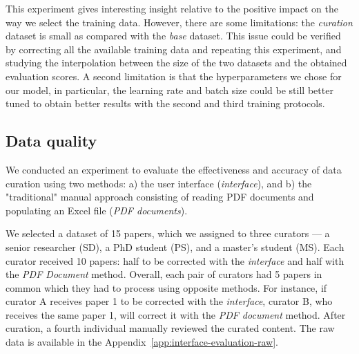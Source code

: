 \documentclass[]{interact}
\theoremstyle{plain} %
\theoremstyle{definition}
\theoremstyle{remark}
\begin{document}

This experiment gives interesting insight relative to the positive impact on the way we select the training data. 
However, there are some limitations: the \emph{curation} dataset is small as compared with the \emph{base} dataset. This issue could be verified by correcting all the available training data and repeating this experiment, and studying the interpolation between the size of the two datasets and the obtained evaluation scores. 
A second limitation is that the hyperparameters we chose for our model, in particular, the learning rate and batch size could be still better tuned to obtain better results with the second and third training protocols.


\subsection{Data quality}
\label{sec:interface-evaluation}
We conducted an experiment to evaluate the effectiveness and accuracy of data curation using two methods: a) the user interface (\textit{interface}), and b) the "traditional" manual approach consisting of reading PDF documents and populating an Excel file (\textit{PDF documents}).

We selected a dataset of 15 papers, which we assigned to three curators — a senior researcher (SD), a PhD student (PS), and a master's student (MS). 
Each curator received 10 papers: half to be corrected with the \textit{interface} and half with the \textit{PDF Document} method. 
Overall, each pair of curators had 5 papers in common which they had to process using opposite methods.
For instance, if curator A receives paper 1 to be corrected with the \textit{interface}, curator B, who receives the same paper 1, will correct it with the \textit{PDF document} method.
After curation, a fourth individual manually reviewed the curated content. The raw data is available in the Appendix~\ref{app:interface-evaluation-raw}.
\end{document}
